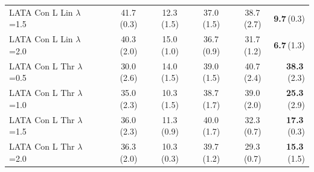 \begin{longtable}{lrrrrr}
LATA Con L Lin $\lambda$=1.5 & 41.7\,(0.3) & 12.3\,(1.5) & 37.0\,(1.5) & 38.7\,(2.7) & \textbf{9.7}\,(0.3) \\
LATA Con L Lin $\lambda$=2.0 & 40.3\,(2.0) & 15.0\,(1.0) & 36.7\,(0.9) & 31.7\,(1.2) & \textbf{6.7}\,(1.3) \\
LATA Con L Thr $\lambda$=0.5 & 30.0\,(2.6) & 14.0\,(1.5) & 39.0\,(1.5) & 40.7\,(2.4) & \textbf{38.3}\,(2.3) \\
LATA Con L Thr $\lambda$=1.0 & 35.0\,(2.3) & 10.3\,(1.5) & 38.7\,(1.7) & 39.0\,(2.0) & \textbf{25.3}\,(2.9) \\
LATA Con L Thr $\lambda$=1.5 & 36.0\,(2.3) & 11.3\,(0.9) & 40.0\,(1.7) & 32.3\,(0.7) & \textbf{17.3}\,(0.3) \\
LATA Con L Thr $\lambda$=2.0 & 36.3\,(2.0) & 10.3\,(0.3) & 39.7\,(1.2) & 29.3\,(0.7) & \textbf{15.3}\,(1.5) \\
\end{longtable}